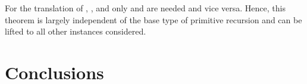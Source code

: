 \documentclass{jfp}
\begin{document}
For the translation of ,
, and  only
 and  are
needed and vice versa. Hence, this theorem is largely independent
of the base type of primitive recursion and can be lifted to all other
instances considered.



%




\section{Conclusions}
\label{sec:conclusions}




\label{lastpage01}
\end{document}
